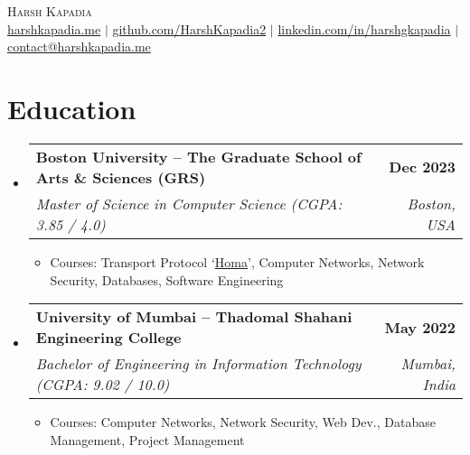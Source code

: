 \documentclass[letterpaper,11pt]{article}
\makeatletter
\newcommand{\resumeItem}[1]{
  \item\small{
    {#1 \vspace{-2pt}}
  }
}
\newcommand{\resumeSubheading}[4]{
  \vspace{-2pt}\item
    \begin{tabular*}{1.0\textwidth}[t]{l@{\extracolsep{\fill}}r}
      \vspace{-2pt}\textbf{#1} & \textbf{\small #2} \\
      \textit{\small#3} & \textit{\small #4} \\
    \end{tabular*}\vspace{-7pt}
}
\newcommand{\resumeSubHeadingListStart}{\begin{itemize}[leftmargin=0.0in, label={}]}
\newcommand{\resumeSubHeadingListEnd}{\end{itemize}}
\newcommand{\resumeItemListStart}{\begin{itemize}}
\newcommand{\resumeItemListEnd}{\end{itemize}\vspace{-5pt}}
\makeatother
\begin{document}

\begin{center}
    {\huge \scshape Harsh Kapadia} \\ \vspace{5pt}
    \small
    \href{https://harshkapadia.me}{harshkapadia.me} $|$ \href{https://github.com/HarshKapadia2}{github.com/HarshKapadia2} $|$ \href{https://linkedin.com/in/harshgkapadia}{linkedin.com/in/harshgkapadia} $|$ \href{mailto:contact@harshkapadia.me}{contact@harshkapadia.me}
    \vspace{-8pt}
\end{center}


\section{Education}
    \resumeSubHeadingListStart
        \resumeSubheading
            {Boston University -- The Graduate School of Arts \& Sciences (GRS)}{Dec 2023}
            {Master of Science in Computer Science (CGPA: 3.85 / 4.0)}{Boston, USA}
            \resumeItemListStart
                \resumeItem{Courses: Transport Protocol `\href{https://networking.harshkapadia.me/files/homa/report}{Homa}', Computer Networks, Network Security, Databases, Software Engineering}
            \resumeItemListEnd

        \resumeSubheading
            {University of Mumbai -- Thadomal Shahani Engineering College}{May 2022}
            {Bachelor of Engineering in Information Technology (CGPA: 9.02 / 10.0)}{Mumbai, India}
            \resumeItemListStart
                \resumeItem{Courses: Computer Networks, Network Security, Web Dev., Database Management, Project Management}
            \resumeItemListEnd
    \resumeSubHeadingListEnd
\vspace{-19pt}


\end{document}
